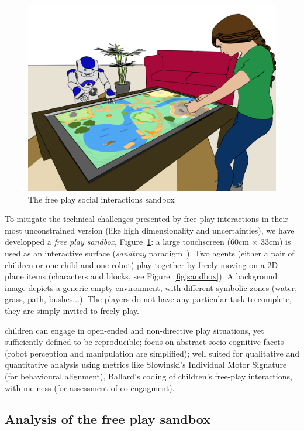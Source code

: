 \documentclass[a4paper]{article}
\begin{document}
\begin{figure}
    \centering
    \includegraphics[width=0.9\linewidth]{setup.png}
    \caption{The free play social interactions sandbox}
    \label{fig|setup}
\end{figure}

To mitigate the technical challenges presented by free play interactions in
their most unconstrained version (like
high dimensionality and uncertainties), we have developped a \emph{free play
sandbox}, Figure~\ref{fig|setup}: a large touchscreen (60cm $\times$ 33cm) is
used as an interactive surface (\emph{sandtray}
paradigm~\cite{baxter2012touchscreen}). Two agents (either a pair of children or
one child and one robot) play together by freely moving on a 2D plane items
(characters and blocks, see Figure~\ref{fig|sandbox}). A background image
depicts a generic empty environment, with different symbolic zones (water,
grass, path, bushes...). The players do not have any particular task to
complete, they are simply invited to freely play.


children can engage in open-ended and
non-directive play situations, yet sufficiently
defined to be reproducible; focus on abstract socio-cognitive facets (robot
perception and manipulation are simplified); well suited for qualitative and
quantitative analysis using metrics like Słowinski’s Individual Motor Signature
(for behavioural alignment), Ballard’s coding of children’s free-play
interactions, with-me-ness (for assessment of co-engagment).



\subsection{Analysis of the free play sandbox}
\end{document}
